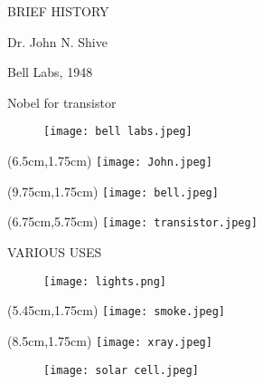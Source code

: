 \documentclass[14pt]{beamer}
\begin{document}
\begin{frame}{BRIEF HISTORY}
	
		\begin{flushleft}
		\begin{list}{--}{}
			\item Dr. John N. Shive
			\item Bell Labs, 1948
			\item Nobel for transistor
		\end{list}
	\end{flushleft}

	\begin{figure}[H]
	\begin{flushleft}
		\texttt{[image: bell labs.jpeg]}
	\end{flushleft}
\end{figure}

\begin{textblock*}{3cm}(6.5cm,1.75cm) %
	\texttt{[image: John.jpeg]}
\end{textblock*}

\begin{textblock*}{3cm}(9.75cm,1.75cm) %
	\texttt{[image: bell.jpeg]}
\end{textblock*}

\begin{textblock*}{3cm}(6.75cm,5.75cm) %
	\texttt{[image: transistor.jpeg]}
\end{textblock*}	
	



\end{frame}

\begin{frame}{VARIOUS USES}
	
		\begin{figure}[H]
		\begin{flushleft}
			\texttt{[image: lights.png]}
		\end{flushleft}
	\end{figure}

	\begin{textblock*}{3cm}(5.45cm,1.75cm) %
	\texttt{[image: smoke.jpeg]}
\end{textblock*}

	\begin{textblock*}{3cm}(8.5cm,1.75cm) %
	\texttt{[image: xray.jpeg]}
\end{textblock*}
	
		\begin{figure}[H]
		\begin{flushleft}
			\texttt{[image: solar cell.jpeg]}
		\end{flushleft}
	\end{figure}
	
\end{frame}
\end{document}
